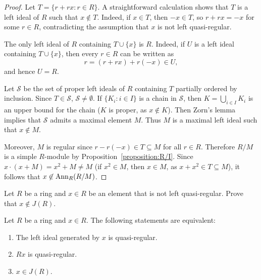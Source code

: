 \begin{proof}
  Let $T=\{r+rx:r\in R\}$. A straightforward calculation shows that $T$ is a
  left ideal of $R$ such that $x\not\in T$. Indeed, if $x\in T$, then $-x\in
  T$, so $r+rx=-x$ for some $r\in R$, contradicting the assumption that $x$ is
  not left quasi-regular. 

  The only left ideal of $R$ containing $T\cup\{x\}$ is $R$. Indeed, if $U$ is
  a left ideal containing $T\cup\{x\}$, then every $r\in R$ can be written as
	\[
    r=(r+rx)+r(-x)\in U,
    \]
  and hence $U=R$.

  Let $\mathcal{S}$ be the set of proper left ideals of $R$ containing $T$
  partially ordered by inclusion. Since $T\in\mathcal{S}$,
  $\mathcal{S}\ne\emptyset$.  If $\{K_i:i\in I\}$ is a chain in $\mathcal{S}$,
  then $K=\bigcup_{i\in I}K_i$ is an upper bound for the chain 
	($K$ is proper, as $x\not\in K$). Then Zorn's lemma implies that 
	$\mathcal{S}$ admits a maximal element $M$. Thus $M$
	is a maximal left ideal such that $x\not\in M$.
 
  Moreover, $M$ is regular
	since $r-r(-x)\in T\subseteq M$ for all $r\in R$. Therefore $R/M$ is a simple
	$R$-module by Proposition~\ref{proposition:R/I}. Since
    $x\cdot(x+M)=x^2+M\ne M$ (if $x^2\in M$, then $x\in M$, as
    $x+x^2\in
	T\subseteq M$), it follows that $x\not\in\operatorname{Ann}_R(R/M)$.
\end{proof}

\begin{exercise}
\label{xca:not_in_J(R)}
Let $R$ be a ring and 
$x\in R$ be an element that is not left quasi-regular. Prove that $x\not\in J(R)$. 
\end{exercise}

\begin{theorem}
	\label{thm:casireg_eq}
	Let $R$ be a ring and $x\in R$. The following statements are equivalent: 
	\begin{enumerate}
		\item The left ideal generated by $x$ is quasi-regular.
		\item $Rx$ is quasi-regular.
		\item $x\in J(R)$.
	\end{enumerate}
\end{theorem}

